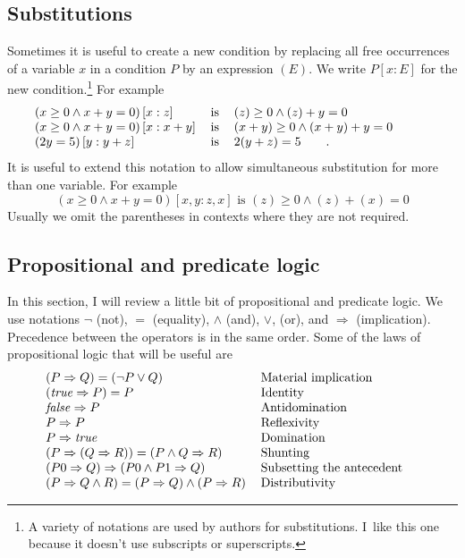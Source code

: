 \documentclass[11pt]{article}%
\begin{document}
\subsection{Substitutions}

Sometimes it is useful to create a new condition by replacing all free
occurrences of a variable $x$ in a condition $P$ by an expression $(E)$. We
write $P[x:E]$ for the new condition.\footnote{A variety of notations are used
by authors for substitutions. I\ like this one because it doesn't use
subscripts or superscripts.} For example%
\[%
\begin{tabular}
[c]{lll}%
$\left(  x\geq0\wedge x+y=0\right)  [x:z]$ & is & $\left(  z\right)
\geq0\wedge\left(  z\right)  +y=0$\\
$\left(  x\geq0\wedge x+y=0\right)  [x:x+y]$ & is & $\left(  x+y\right)
\geq0\wedge\left(  x+y\right)  +y=0$\\
$\left(  2y=5\right)  [y:y+z]$ & is & $2(y+z)=5\qquad\text{.}$%
\end{tabular}
\ \ \ \ \ \ \ \ \
\]
It is useful to extend this notation to allow simultaneous substitution for
more than one variable. For example%
\[
\left(  x\geq0\wedge x+y=0\right)  [x,y:z,x]\text{ is }\left(  z\right)
\geq0\wedge\left(  z\right)  +\left(  x\right)  =0
\]
Usually we omit the parentheses in contexts where they are not required.

\subsection{Propositional and predicate logic}

In this section, I will review a little bit of propositional and predicate
logic. We use notations $\lnot$ (not), $=$ (equality), $\wedge$ (and), $\vee$,
(or), and $\Rightarrow$ (implication). Precedence between the operators is in
the same order. Some of the laws of propositional logic that will be useful
are%
\[%
\begin{tabular}
[c]{ll}%
$\left(  P\Rightarrow Q\right)  =\left(  \lnot P\vee Q\right)  $ & Material
implication\\
$\left(  \mathit{true}\Rightarrow P\right)  =P$ & Identity\\
$\mathit{false}\Rightarrow P$ & Antidomination\\
$P\Rightarrow P$ & Reflexivity\\
$P\Rightarrow\mathit{true}$ & Domination\\
$\left(  P\Rightarrow(Q\Rightarrow R)\right)  =\left(  P\wedge Q\Rightarrow
R\right)  $ & Shunting\\
$\left(  P0\Rightarrow Q\right)  \Rightarrow\left(  P0\wedge P1\Rightarrow
Q\right)  $ & Subsetting the antecedent\\
$\left(  P\Rightarrow Q\wedge R\right)  =\left(  P\Rightarrow Q\right)
\wedge\left(  P\Rightarrow R\right)  $ & Distributivity
\end{tabular}
\ \ \ \
\]
\end{document}
